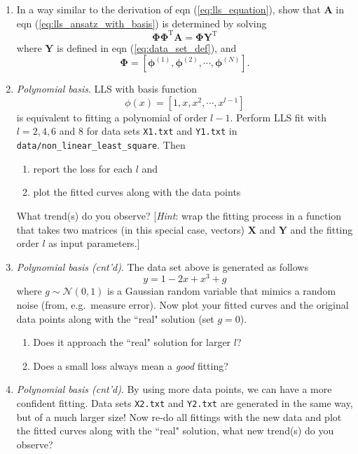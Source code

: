 \documentclass[a4paper,twoside, 10pt]{article}
\theoremstyle{wick}
\newcommand{\tr}{\textrm}
\newcommand{\mat}[1]{\mathbf{#1}}
\newcommand{\ttt}{\texttt}
\begin{document}
	\begin{enumerate}
		\item In a way similar to the derivation of eqn (\ref{eq:lls_equation}), show that $\mat{A}$ in eqn (\ref{eq:lls_ansatz_with_basis}) is determined by solving
		\begin{equation}
			\mat{\Phi} \mat{\Phi}^{\tr{T}} \mat{A}
				= \mat{\Phi} \mat{Y}^{\tr{T}}
		\end{equation}
		where $\mat{Y}$ is defined in eqn (\ref{eq:data_set_def}), and
		\begin{equation}
			\mat{\Phi}
				= [\bm{\phi}^{(1)}, \bm{\phi}^{(2)}, \cdots{}, \bm{\phi}^{(N)}].
		\end{equation}

		\item \textit{Polynomial basis}. LLS with basis function
		\begin{equation}
			\phi(x)
				= [1, x, x^2, \cdots{}, x^{l-1}]
		\end{equation}
		is equivalent to fitting a polynomial of order $l-1$. Perform LLS fit with $l = 2, 4, 6$ and $8$ for data sets \ttt{X1.txt} and \ttt{Y1.txt} in \ttt{data/non\_linear\_least\_square}. Then
		\begin{enumerate}
			\item report the loss for each $l$ and
			\item plot the fitted curves along with the data points
		\end{enumerate}
		What trend(s) do you observe? [\textit{Hint}: wrap the fitting process in a function that takes two matrices (in this special case, vectors) $\mat{X}$ and $\mat{Y}$ and the fitting order $l$ as input parameters.]

		\item \textit{Polynomial basis (cnt'd)}. The data set above is generated as follows
		\begin{equation}
			y
				= 1 - 2x + x^3 + g
		\end{equation}
		where $g \sim \mathcal{N}(0, 1)$ is a Gaussian random variable that mimics a random noise (from, e.g.\ measure error). Now plot your fitted curves and the original data points along with the ``real" solution (set $g = 0$).
		\begin{enumerate}
			\item Does it approach the ``real" solution for larger $l$?
			\item Does a small loss always mean a \emph{good} fitting?
		\end{enumerate}

		\item \textit{Polynomial basis (cnt'd)}. By using more data points, we can have a more confident fitting. Data sets \ttt{X2.txt} and \ttt{Y2.txt} are generated in the same way, but of a much larger size! Now re-do all fittings with the new data and plot the fitted curves along with the ``real" solution, what new trend(s) do you observe?
	\end{enumerate}
\end{document}
